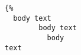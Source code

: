 \documentclass{article}
\begin{document}
\begin{verbatim}{%
  body text
        body text
          body 
text
\end{verbatim}
\end{document}

